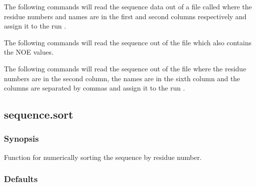 The following commands will read the sequence data out of a file called  where the residue numbers and names are in the first and second columns respectively and assign it to the run .





The following commands will read the sequence out of the file  which also contains the NOE values.





The following commands will read the sequence out of the file  where the residue numbers are in the second column, the names are in the sixth column and the columns are separated by commas and assign it to the run .






\newpage

\subsection{sequence.sort}


\subsubsection{Synopsis}

Function for numerically sorting the sequence by residue number.



\subsubsection{Defaults}

